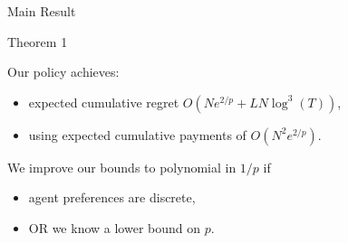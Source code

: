 \documentclass[serif]{beamer}
\begin{document}
\begin{frame}{Main Result}
\begin{block}{Theorem 1}

Our policy achieves:
\begin{itemize}
\item expected cumulative regret $O (N e^{2/p} + L N \log^3(T))$,
\item using expected cumulative payments of $O(N^2 e^{2/p})$.
\end{itemize}
\end{block}

\vspace{0.5cm}

We improve our bounds to polynomial in $1/p$ if
\begin{itemize}
\item agent preferences are discrete,
\item OR we know a lower bound on $p$.
\end{itemize}




\end{frame}


\end{document}
